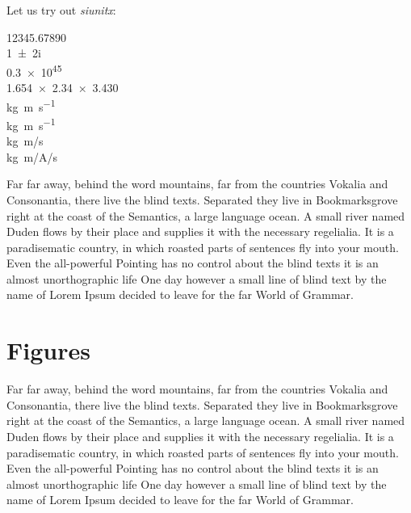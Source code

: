 Let us try out \emph{siunitx}: 

\num{12345,67890} \\
\num{1+-2i} \\
\num{.3e45} \\
\num{1.654 x 2.34 x 3.430}\\
\si{kg.m.s^{-1}} \\
\si{\kilogram\metre\per\second} \\
\si[per-mode=symbol]
{\kilogram\metre\per\second} \\
\si[per-mode=symbol]
{\kilogram\metre\per\ampere\per\second}

Far far away, behind the word mountains, far from the countries Vokalia and
Consonantia, there live the blind texts. Separated they live in
Bookmarksgrove right at the coast of the Semantics, a large language
ocean. A small river named Duden flows by their place and supplies it with
the necessary regelialia. It is a paradisematic country, in which roasted
parts of sentences fly into your mouth. Even the all-powerful Pointing has
no control about the blind texts it is an almost unorthographic life One
day however a small line of blind text by the name of Lorem Ipsum decided
to leave for the far World of Grammar.

\section{Figures}
\label{sec:figures}

Far far away, behind the word mountains, far from the countries Vokalia and
Consonantia, there live the blind texts. Separated they live in
Bookmarksgrove right at the coast of the Semantics, a large language
ocean. A small river named Duden flows by their place and supplies it with
the necessary regelialia. It is a paradisematic country, in which roasted
parts of sentences fly into your mouth. Even the all-powerful Pointing has
no control about the blind texts it is an almost unorthographic life One
day however a small line of blind text by the name of Lorem Ipsum decided
to leave for the far World of Grammar.

